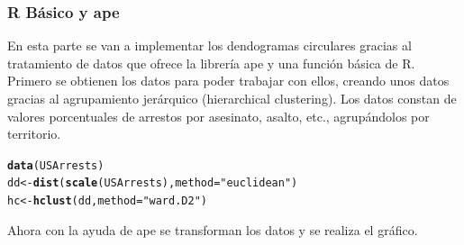 \documentclass{article}\usepackage[]{graphicx}\usepackage[]{color}
\makeatletter
\newcommand{\hlstr}[1]{\textcolor[rgb]{0.192,0.494,0.8}{#1}}%
\newcommand{\hlstd}[1]{\textcolor[rgb]{0.345,0.345,0.345}{#1}}%
\newcommand{\hlkwb}[1]{\textcolor[rgb]{0.69,0.353,0.396}{#1}}%
\newcommand{\hlkwc}[1]{\textcolor[rgb]{0.333,0.667,0.333}{#1}}%
\newcommand{\hlkwd}[1]{\textcolor[rgb]{0.737,0.353,0.396}{\textbf{#1}}}%
\newenvironment{kframe}{%
 \def\at@end@of@kframe{}%
 \ifinner\ifhmode%
  \def\at@end@of@kframe{\end{minipage}}%
  \begin{minipage}{\columnwidth}%
 \fi\fi%
 \def\FrameCommand##1{\hskip\@totalleftmargin \hskip-\fboxsep
 \colorbox{shadecolor}{##1}\hskip-\fboxsep
     \hskip-\linewidth \hskip-\@totalleftmargin \hskip\columnwidth}%
 \MakeFramed {\advance\hsize-\width
   \@totalleftmargin\z@ \linewidth\hsize
   \@setminipage}}%
 {\par\unskip\endMakeFramed%
 \at@end@of@kframe}
\newenvironment{knitrout}{}{} %
\makeatother
\begin{document}
\subsubsection{R B\'asico y ape}
En esta parte se van a implementar los dendogramas circulares gracias al tratamiento de datos que ofrece la librer\'ia ape y una funci\'on b\'asica de R.~\\
Primero se obtienen los datos para poder trabajar con ellos, creando unos datos gracias al agrupamiento jer\'arquico (hierarchical clustering). Los datos constan de valores porcentuales de arrestos por asesinato, asalto, etc., agrup\'andolos por territorio.
\begin{knitrout}
\color{fgcolor}\begin{kframe}
\begin{alltt}
\hlkwd{data}\hlstd{(USArrests)}
\hlstd{dd} \hlkwb{<-} \hlkwd{dist}\hlstd{(}\hlkwd{scale}\hlstd{(USArrests),} \hlkwc{method} \hlstd{=} \hlstr{"euclidean"}\hlstd{)}
\hlstd{hc} \hlkwb{<-} \hlkwd{hclust}\hlstd{(dd,} \hlkwc{method} \hlstd{=} \hlstr{"ward.D2"}\hlstd{)}
\end{alltt}
\end{kframe}
\end{knitrout}
Ahora con la ayuda de ape %
se transforman los datos y se realiza el gr\'afico.
\end{document}
